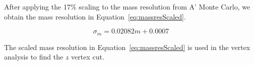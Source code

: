 After applying the 17$\%$ scaling to the mass resolution from A' Monte Carlo, we obtain the mass resolution in Equation~\eqref{eq:massresScaled}.

\begin{equation}
\label{eq:massresScaled}
\sigma_m = 0.02082m+0.0007
\end{equation}

The scaled mass resolution in Equation~\eqref{eq:massresScaled} is used in the vertex analysis to find the $z$ vertex cut. 



